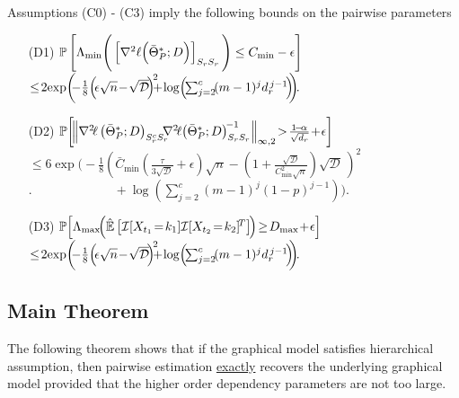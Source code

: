\begin{lemma}
Assumptions (C0) - (C3) imply the following bounds on the pairwise parameters
\begin{itemize}
\item [(D1)] $\mathbb{P}\left[\Lambda_{\min}\Bigg(\left[\nabla^2\ell\Big(\bar{\Theta}^*_P;D\Big)\right]_{S_{r}S_{r}}\Bigg)\leq C_{\min}-\epsilon\right]$\\ $\leq \!2\!\exp\!\left(\!\!-\frac{1}{8}\!\left(\!\epsilon\sqrt{n}\!-\!\sqrt{\mathcal{D}}\!\right)^{\!2} \!\!\!\!+\!\log\!\left(\!\sum_{j=2}^{c}\!(m-1)^jd_\svert^{\,j-1}\!\right)\!\!\right)\!\!.$

\item [(D2)] $\mathbb{P}\!\left[\!\norm{\nabla^2\!\ell\left(\bar{\Theta}^*_P;D\right)_{\support_\svert^c\support_\svert}\!\!\!\! \nabla^2\!\ell\!\left(\bar{\Theta}^*_P;D\right)_{\support_\svert\support_\svert}^{\!-1}}{\infty,2}\! >\! \frac{1\!-\!\alpha}{\sqrt{d_\svert}}\!+\!\epsilon\right]$\\
$\leq\! 6\!\exp\!\!\Big(\!-\frac{1}{8}\!\!\left(\bar{C}_{\min}\!\!\left(\frac{\tau}{3\sqrt{\mathcal{D}}}\!+\!\epsilon\right)\!\!\sqrt{n} -\!\!\left(\!1\!+\!\frac{\sqrt{\mathcal{D}}}{C_{\min}^2\sqrt{n}}\!\right) \!\!\sqrt{\mathcal{D}}\,\right)^{\!2}$\\ $.\qquad\qquad\qquad\,\,\,+\log\left(\!\sum_{j=2}^c(m-1)^j(1-p)^{j-1}\right)\!\!\Big)\!$.

\item [(D3)] $\mathbb{P}\!\left[\Lambda_{\max}\!\!\left(\hat{\mathbb{E}}\left[\I[X_{t_1}\!=\!k_1]\I[X_{t_2}\!=\!k_2]^{\!T}\right]\!\right)
\!\geq\! D_{\max}\!+\!\epsilon\right]$\\ $\leq \!2\!\exp\!\left(\!\!-\frac{1}{8}\!\left(\!\epsilon\sqrt{n}\!-\!\sqrt{\mathcal{D}}\!\right)^{\!2} \!\!\!\!+\!\log\!\left(\!\sum_{j=2}^{c}\!(m-1)^jd_\svert^{\,j-1}\!\right)\!\!\right)\!\!.$
\end{itemize}
\label{concentration_clique}
\end{lemma}

\subsection{Main Theorem}
\noindent The following theorem shows that if the graphical model satisfies hierarchical assumption, then pairwise estimation \underline{exactly} recovers the underlying graphical model provided that the higher order dependency parameters are not too large.

